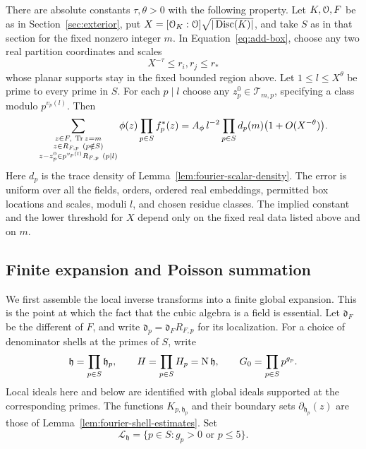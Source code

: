 \begin{proposition}
\label{prop:additive-equidistribution}
There are absolute constants \(\tau,\theta>0\) with the following property.
Let \(K,\mathcal O,F\) be as in Section~\ref{sec:exterior}, put
\(X=[\mathcal O_K:\mathcal O]\sqrt{|\operatorname{Disc}(K)|}\), and take \(S\) as in that section for
the fixed nonzero integer \(m\).  In Equation~\eqref{eq:add-box}, choose any
two real partition coordinates and scales
\[
 X^{-\tau}\le r_i,r_j\le r_*
\]
whose planar supports stay in the fixed bounded region above.  Let
\(1\le l\le X^\theta\) be prime to every prime in \(S\).  For each \(p\mid l\)
choose any \(z_p^0\in\mathcal T_{m,p}\), specifying a class modulo
\(p^{v_p(l)}\).  Then
\begin{equation}
 \sum_{\substack{z\in F,\ \operatorname{Tr} z=m\\
                  z\in R_{F,p}\ (p\notin S)\\
                  z-z_p^0\in p^{v_p(l)}R_{F,p}\ (p\mid l)}}
       \phi(z)\prod_{p\in S}f_p^*(z)
 =
 A_\phi\,l^{-2}\prod_{p\in S}d_p(m)
       \bigl(1+O(X^{-\theta})\bigr).
 \label{eq:add-equidistribution}
\end{equation}
Here \(d_p\) is the trace density of Lemma~\ref{lem:fourier-scalar-density}.
The error is uniform over all the fields, orders, ordered real embeddings,
permitted box locations and scales, moduli \(l\), and chosen residue classes.
The implied constant and the lower threshold for \(X\) depend only on the
fixed real data listed above and on \(m\).
\end{proposition}

\subsection{Finite expansion and Poisson summation}

We first assemble the local inverse transforms into a finite global
expansion.  This is the point at which the fact that the cubic algebra is a
field is essential.  Let \(\mathfrak d_F\) be the different of \(F\), and
write \(\mathfrak d_p=\mathfrak d_F R_{F,p}\) for its localization.
For a choice of denominator shells at the primes of \(S\), write
\[
 \mathfrak h=\prod_{p\in S}\mathfrak h_p,\qquad
 H=\prod_{p\in S}H_p=\operatorname{N}\mathfrak h,\qquad
 G_0=\prod_{p\in S}p^{g_p}.
\]
Local ideals here and below are identified with global ideals supported at
the corresponding primes.  The functions \(K_{p,\mathfrak h_p}\) and their
boundary sets \(\partial_{\mathfrak h_p}(z)\) are those of
Lemma~\ref{lem:fourier-shell-estimates}.  Set
\[
 \mathscr L_{\mathfrak h}=\{p\in S:g_p>0\text{ or }p\le5\}.
\]

